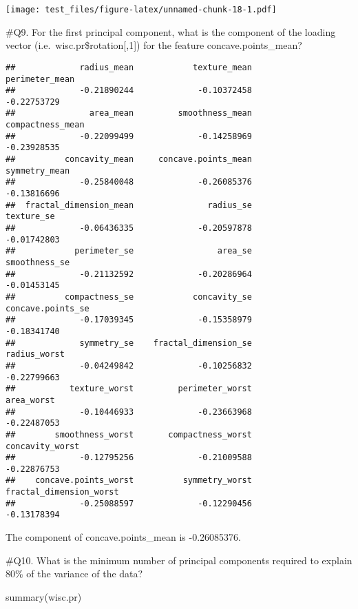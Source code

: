 \documentclass[
]{article}
\newenvironment{Shaded}{\begin{snugshade}}{\end{snugshade}}
\newcommand{\DecValTok}[1]{\textcolor[rgb]{0.00,0.00,0.81}{#1}}
\newcommand{\FunctionTok}[1]{\textcolor[rgb]{0.00,0.00,0.00}{#1}}
\newcommand{\NormalTok}[1]{#1}
\newcommand{\SpecialCharTok}[1]{\textcolor[rgb]{0.00,0.00,0.00}{#1}}
\begin{document}
\texttt{[image: test\_files/figure-latex/unnamed-chunk-18-1.pdf]}

\#Q9. For the first principal component, what is the component of the
loading vector (i.e.~wisc.pr\$rotation{[},1{]}) for the feature
concave.points\_mean?

\begin{Shaded}
\end{Shaded}

\begin{verbatim}
##             radius_mean            texture_mean          perimeter_mean 
##             -0.21890244             -0.10372458             -0.22753729 
##               area_mean         smoothness_mean        compactness_mean 
##             -0.22099499             -0.14258969             -0.23928535 
##          concavity_mean     concave.points_mean           symmetry_mean 
##             -0.25840048             -0.26085376             -0.13816696 
##  fractal_dimension_mean               radius_se              texture_se 
##             -0.06436335             -0.20597878             -0.01742803 
##            perimeter_se                 area_se           smoothness_se 
##             -0.21132592             -0.20286964             -0.01453145 
##          compactness_se            concavity_se       concave.points_se 
##             -0.17039345             -0.15358979             -0.18341740 
##             symmetry_se    fractal_dimension_se            radius_worst 
##             -0.04249842             -0.10256832             -0.22799663 
##           texture_worst         perimeter_worst              area_worst 
##             -0.10446933             -0.23663968             -0.22487053 
##        smoothness_worst       compactness_worst         concavity_worst 
##             -0.12795256             -0.21009588             -0.22876753 
##    concave.points_worst          symmetry_worst fractal_dimension_worst 
##             -0.25088597             -0.12290456             -0.13178394
\end{verbatim}

The component of concave.points\_mean is -0.26085376.

\#Q10. What is the minimum number of principal components required to
explain 80\% of the variance of the data?

\begin{Shaded}
\begin{Highlighting}[]
\FunctionTok{summary}\NormalTok{(wisc.pr)}
\end{Highlighting}
\end{Shaded}
\end{document}
